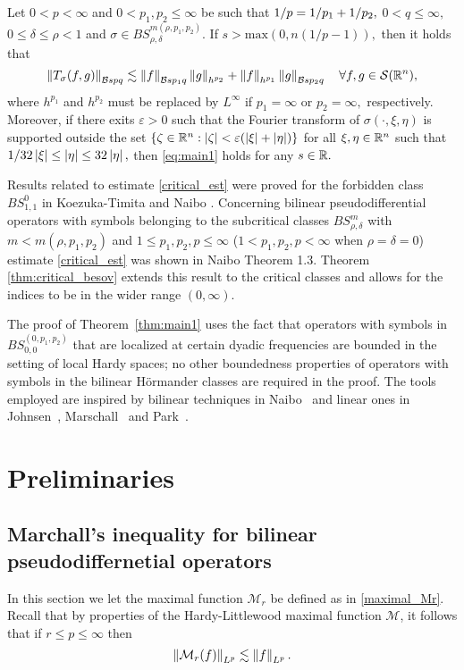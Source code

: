 \begin{theorem} \label{thm:main1}
Let $0<p<\infty$ and  $0<p_1,p_2\le \infty$ be such that $1/p=1/p_1+1/p_2,$ $0<q\le \infty,$   $0\le\delta\le \rho<1$ and   $\sigma\in BS^{m(\rho,p_1,p_2)}_{\rho,\delta}.$ If $s>\text{max}(0,n(1/p - 1)),$ then it holds that
\begin{equation}\label{eq:main1}
\left\|T_\sigma(f,g)\right\|_{\mathcal{B}{s}{p}{q}}\lesssim \left\|f\right\|_{\mathcal{B}{s}{p_1}{q}}\left\|g\right\|_{h^{p_2}} +\left\|f\right\|_{h^{p_1}}\left\|g\right\|_{\mathcal{B}{s}{p_2}{q}}\quad \forall f,g\in {\mathcal{S}}({{\mathbb R}^n}),
\end{equation}
where $h^{p_1}$ and $h^{p_2}$ must be replaced by $L^\infty$ if $p_1=\infty$ or $p_2=\infty,$ respectively. Moreover,  if there exits $\varepsilon>0$ such that the Fourier transform of  $\sigma(\cdot,\xi,\eta)$ is  supported outside the set  $\{\zeta\in{{\mathbb R}^n}:\left\vert \zeta \right\vert<\varepsilon (\left\vert \xi \right\vert+\left\vert \eta \right\vert)\}$ for all  $\xi,\eta\in{{\mathbb R}^n}$ such that $1/32\left\vert \xi \right\vert\le \left\vert \eta \right\vert\le 32 \left\vert \eta \right\vert,$ then \eqref{eq:main1} holds for any $s\in\mathbb{R}.$
\end{theorem}

Results related to estimate \ref{critical_est} were proved for the forbidden class $BS^0_{1,1}$ in Koezuka-Timita \cite{MR3750316} and Naibo \citep{MR3393696}. Concerning bilinear pseudodifferential operators with symbols belonging to the subcritical classes $BS^m_{\rho,\delta}$ with $m<m(\rho,p_1,p_2)$ and $1\leq p_1,p_2,p \leq \infty$ ($1 < p_1,p_2,p < \infty$ when $\rho = \delta = 0$) estimate \ref{critical_est} was shown in Naibo \citep{MR3393696} Theorem 1.3. Theorem \ref{thm:critical_besov} extends this result to the critical classes and allows for the indices to be in the wider range $(0,\infty)$. 

The proof of Theorem~\ref{thm:main1} uses the fact that operators with symbols in $BS^{(0,p_1,p_2)}_{0,0}$ that are localized at certain dyadic frequencies are bounded in the setting of local Hardy spaces; no other boundedness properties of operators with symbols in the bilinear H\"ormander classes are required in the proof. The tools employed are inspired by bilinear techniques in Naibo~\cite{MR3393696} and linear ones in   Johnsen~\cite{MR2163627}, Marschall~\cite{MR1376592} and   Park~\cite{MR3759556}.

\section{Preliminaries}


\subsection{Marchall's inequality for bilinear pseudodiffernetial operators}
In this section we let the maximal function $\mathcal{M}_r$ be defined as in \ref{maximal_Mr}. Recall that by properties of the Hardy-Littlewood maximal function $\mathcal{M}$, it follows that if $r\leq p\leq \infty$ then 
\begin{equation}
\left\|\mathcal{M}_r(f)\right\|_{L^p} \lesssim \left\|f\right\|_{L^p}.
\end{equation}

